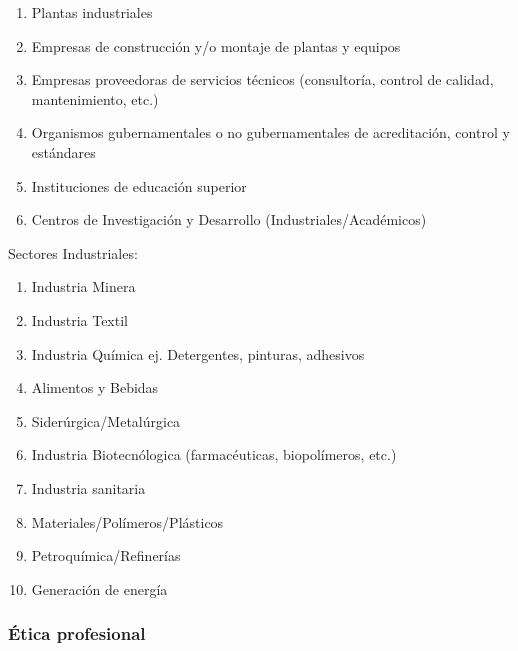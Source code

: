         \begin{multicols}{2}
            \begin{enumerate}
                \item Plantas industriales
                \item Empresas de construcción y/o montaje de plantas y equipos
                \item Empresas proveedoras de servicios técnicos (consultoría, control de calidad, mantenimiento, etc.)
                \item Organismos gubernamentales o no gubernamentales de acreditación, control y estándares
                \item Instituciones de educación superior
                \item Centros de Investigación y Desarrollo (Industriales/Académicos)
            \end{enumerate}
        \end{multicols}
        
        Sectores Industriales:
        
        \begin{multicols}{2}
            \begin{enumerate}
                \item Industria Minera
                \item Industria Textil
                \item Industria Química ej. Detergentes, pinturas, adhesivos
                \item Alimentos y Bebidas
                \item Siderúrgica/Metalúrgica
                \item Industria Biotecnólogica (farmacéuticas, biopolímeros, etc.)
                \item Industria sanitaria
                \item Materiales/Polímeros/Plásticos
                \item Petroquímica/Refinerías
                \item Generación de energía
            \end{enumerate}
        \end{multicols}
        
        \subsubsection{Ética profesional}
        
